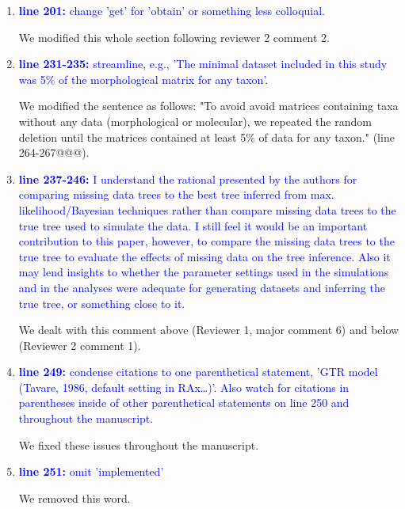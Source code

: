 \documentclass[12pt,letterpaper]{article}
\begin{document}
\begin{enumerate}
\item{\textcolor{blue}{\textbf{line 201:} change 'get' for 'obtain' or something less colloquial.}}

We modified this whole section following reviewer 2 comment 2.

\item{\textcolor{blue}{\textbf{line 231-235:} streamline, e.g., 'The minimal dataset included in this study was 5\% of the morphological matrix for any taxon'.}}

We modified the sentence as follows: "To avoid avoid matrices containing taxa without any data (morphological or molecular), we repeated the random deletion until the matrices contained at least 5\% of data for any taxon." (line 264-267@@@).

\item{\textcolor{blue}{\textbf{line 237-246:} I understand the rational presented by the authors for comparing missing data trees to the best tree inferred from max. likelihood/Bayesian techniques rather than compare missing data trees to the true tree used to simulate the data. I still feel it would be an important contribution to this paper, however, to compare the missing data trees to the true tree to evaluate the effects of missing data on the tree inference. Also it may lend insights to whether the parameter settings used in the simulations and in the analyses were adequate for generating datasets and inferring the true tree, or something close to it. }}

We dealt with this comment above (Reviewer 1, major comment 6) and below (Reviewer 2 comment 1).

\item{\textcolor{blue}{\textbf{line 249:} condense citations to one parenthetical statement, 'GTR model (Tavare, 1986, default setting in RAx…)'. Also watch for citations in parentheses inside of other parenthetical statements on line 250 and throughout the manuscript. }}

We fixed these issues throughout the manuscript.

\item{\textcolor{blue}{\textbf{line 251:} omit 'implemented'}}

We removed this word.


\end{enumerate}
\end{document}
